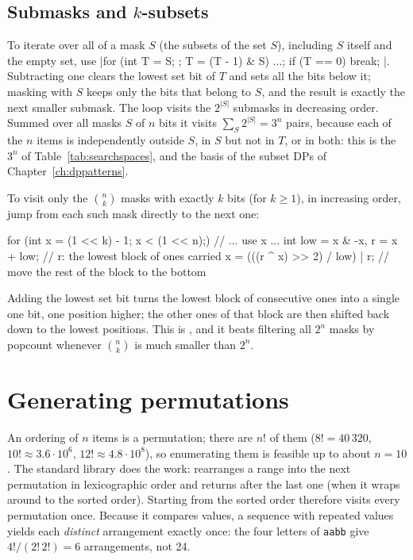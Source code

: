 
\subsection{Submasks and $k$-subsets}

To iterate over all  of a mask $S$ (the subsets of the set $S$), including $S$ itself and the empty
set, use
\cc|for (int T = S; ; T = (T - 1) & S) { ...; if (T == 0) break; }|.
Subtracting one clears the lowest set bit of $T$ and sets all the bits below it; masking with $S$ keeps only the bits that
belong to $S$, and the result is exactly the next smaller submask. The loop visits the $2^{|S|}$ submasks in decreasing
order. Summed over all masks $S$ of $n$ bits it visits $\sum_S 2^{|S|} = 3^n$ pairs, because each of the $n$ items is
independently outside $S$, in $S$ but not in $T$, or in both: this is the $3^n$ of Table~\ref{tab:searchspaces}, and the
basis of the subset DPs of Chapter~\ref{ch:dppatterns}.

\begin{trick}
To visit only the $\binom{n}{k}$ masks with exactly $k$ bits (for $k \ge 1$), in increasing order, jump from each such mask
directly to the next one:
\begin{code}
for (int x = (1 << k) - 1; x < (1 << n);) {
    // ... use x ...
    int low = x & -x, r = x + low;  // r: the lowest block of ones carried
    x = (((r ^ x) >> 2) / low) | r;  // move the rest of the block to the bottom
}
\end{code}
Adding the lowest set bit  turns the lowest block of consecutive ones into a single one bit, one position higher;
the other ones of that block are then shifted back down to the lowest positions. This is , and it beats
filtering all $2^n$ masks by popcount whenever $\binom{n}{k}$ is much smaller than $2^n$.
\end{trick}

\section[Generating permutations]{Generating permutations \hfill \bronze}\label{sec:permutations}

An ordering of $n$ items is a permutation; there are $n!$ of them ($8! = 40\,320$, $10! \approx 3.6 \cdot 10^6$, $12!
\approx 4.8 \cdot 10^8$), so enumerating them is feasible up to about $n = 10$. The standard library does the work:
 rearranges a range into the next permutation in lexicographic order and returns  after the
last one (when it wraps around to the sorted order). Starting from the sorted order therefore visits every permutation once.
Because it compares values, a sequence with repeated values yields each \emph{distinct} arrangement exactly once: the four
letters of \texttt{aabb} give $4!/(2!\,2!) = 6$ arrangements, not 24.

